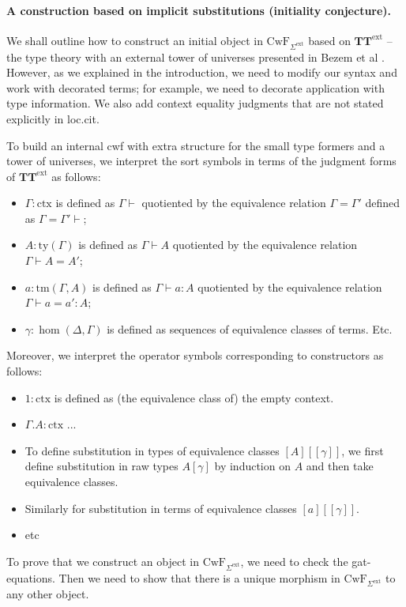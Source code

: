 \documentclass[11pt,a4paper]{article}
\theoremstyle{plain}
\theoremstyle{definition}
\newcommand{\ctx}{\mathrm{ctx}}
\newcommand{\ty}{\mathrm{ty}}
\newcommand{\tm}{\mathrm{tm}}
\def\CwF{\mathrm{CwF}}
\def\Sigmaext{{\Sigma^\mathrm{ext}}}
\def\TText{{\mathbf{TT}^\mathrm{ext}}}
\begin{document}
\paragraph{A construction based on implicit substitutions (initiality conjecture).} 
We shall outline how to construct an initial object in $\CwF_{\Sigmaext}$ based on $\TText$ -- the type theory with an external tower of universes presented in Bezem et al \cite{BezemCDE22}. However, as we explained in the introduction, we need to modify our syntax and work with decorated terms; for example, we need to decorate application with type information. We also add context equality judgments that are not stated explicitly in loc.cit.

To build an internal cwf with extra structure for the small type formers and a tower of universes, we interpret the sort symbols in terms of the judgment forms of $\TText$ as follows:
\begin{itemize}
\item $\Gamma : \ctx$ is defined as $\Gamma \vdash$ quotiented by the equivalence relation $\Gamma = \Gamma'$ defined as $\Gamma = \Gamma' \vdash$;
\item $A : \ty(\Gamma)$ is defined as $\Gamma \vdash A$ quotiented by the equivalence relation $\Gamma \vdash A = A'$;
\item $a : \tm(\Gamma,A)$ is defined as $\Gamma \vdash a : A$ quotiented by the equivalence relation $\Gamma \vdash a = a' : A$;
\item $\gamma : \hom(\Delta,\Gamma)$ is defined as sequences of equivalence classes of terms. Etc.
\end{itemize}
Moreover, we interpret the operator symbols corresponding to constructors as follows:
\begin{itemize}
\item $ 1 : \ctx$ is defined as (the equivalence class of) the empty context.
\item $\Gamma.A : \ctx$ ...
\end{itemize}
\begin{itemize}
\item To define substitution in types of equivalence classes $[A][[\gamma]]$, we first define substitution in raw types $A[\gamma]$ by induction on $A$ and then take equivalence classes.
\item Similarly for substitution in terms of equivalence classes $[a][[\gamma]]$.
\item etc
\end{itemize}
To prove that we construct an object in $\CwF_\Sigmaext$, we need to check the gat-equations. Then we need to show that there is a unique morphism in $\CwF_\Sigmaext$ to any other object.
\end{document}
